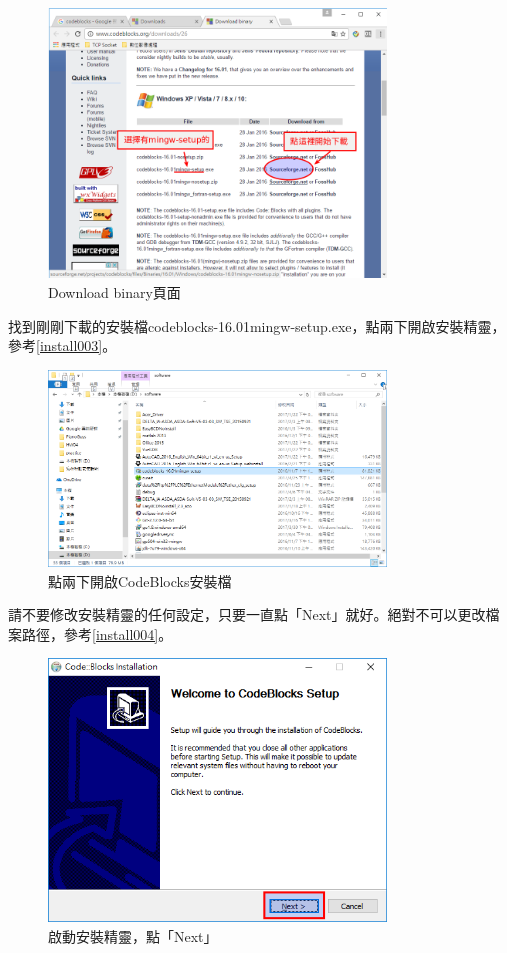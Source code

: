 	\begin{figure}[H]
		\centering
		\includegraphics[width=0.8\textwidth]{fig/install_and_setting/install_002_Download_binary}
		\caption{Download binary頁面}
		\label{install002}
	\end{figure}
	
	找到剛剛下載的安裝檔codeblocks-16.01mingw-setup.exe，點兩下開啟安裝精靈，參考\autoref{install003}。
	\begin{figure}[H]
		\centering
		\includegraphics[width=0.8\textwidth]{fig/install_and_setting/install_003_openEXE}
		\caption{點兩下開啟CodeBlocks安裝檔}
		\label{install003}
	\end{figure}
	
	請不要修改安裝精靈的任何設定，只要一直點「Next」就好。絕對不可以更改檔案路徑，參考\autoref{install004}。
		\begin{figure}[H]
			\centering
			\includegraphics[width=0.8\textwidth]{fig/install_and_setting/install_004_setup01}
			\caption{啟動安裝精靈，點「Next」}
			\label{install004}
		\end{figure}
	
